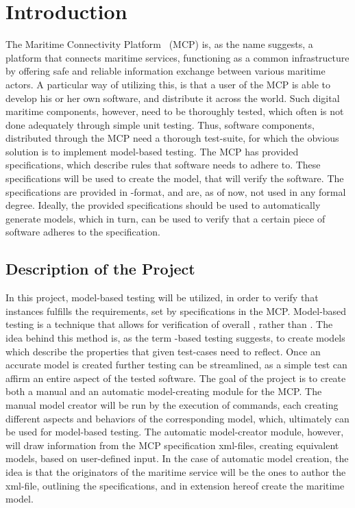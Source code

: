 \chapter{Introduction}
The Maritime Connectivity Platform~\cite{mcp} (MCP) is, as the name suggests, a platform that connects maritime services, functioning as a common infrastructure by offering safe and reliable information exchange between various maritime actors. A particular way of utilizing this, is that a user of the MCP is able to develop his or her own software, and distribute it across the world. Such digital maritime components, however, need to be thoroughly tested, which often is not done adequately through simple unit testing. Thus, software components, distributed through the MCP need a thorough test-suite, for which the obvious solution is to implement model-based testing.
The MCP has provided specifications, which describe rules that software needs to adhere to. These specifications will be used to create the model, that will verify the software. The specifications are provided in -format, and are, as of now, not used in any formal degree. Ideally, the provided specifications should be used to automatically generate models, which in turn, can be used to verify that a certain piece of software adheres to the specification. 
\section{Description of the Project}
In this project, model-based testing will be utilized, in order to verify that instances fulfills the requirements, set by specifications in the MCP. Model-based testing is a technique that allows for verification of overall , rather than . The idea behind this method is, as the term -based testing suggests, to create models which describe the properties that given test-cases need to reflect. 
Once an accurate model is created further testing can be streamlined, as a simple test can affirm an entire aspect of the tested software.
The goal of the project is to create both a manual and an automatic model-creating module for the MCP. The manual model creator will be run by the execution of commands, each creating different aspects and behaviors of the corresponding model, which, ultimately can be used for model-based testing. 
The automatic model-creator module, however, will draw information from the MCP specification xml-files, creating equivalent models, based on user-defined input. In the case of automatic model creation, the idea is that the originators of the maritime service will be the ones to author the xml-file, outlining the specifications, and in extension hereof create the maritime model.
